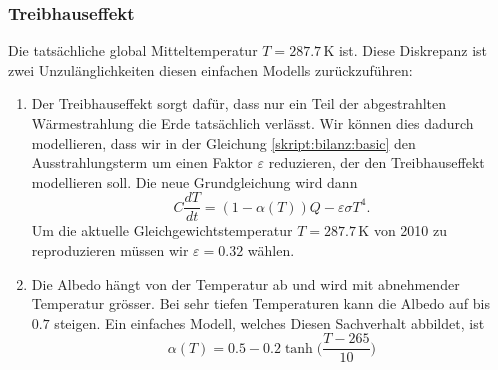 \subsubsection{Treibhauseffekt}
Die tatsächliche global Mitteltemperatur $T=287.7\,\text{K}$ ist.
Diese Diskrepanz ist zwei Unzulänglichkeiten diesen einfachen
Modells zurückzuführen:
\begin{enumerate}
\item
Der Treibhauseffekt sorgt dafür, dass nur ein Teil der abgestrahlten
Wärmestrahlung die Erde tatsächlich verlässt.
Wir können dies dadurch modellieren, dass wir in der Gleichung
\eqref{skript:bilanz:basic} den Ausstrahlungsterm um einen Faktor
$\varepsilon$ reduzieren, der den Treibhauseffekt modellieren soll.
Die neue Grundgleichung wird dann
\begin{equation}
C\frac{dT}{dt}
=
(1-\alpha(T)) Q - \varepsilon\sigma T^4.
\label{skript:bilanz:basic2}
\end{equation}
Um die aktuelle Gleichgewichtstemperatur $T=287.7\,\text{K}$ von 2010
zu reproduzieren müssen wir $\varepsilon=0.32$ wählen.
\item
Die Albedo hängt von der Temperatur ab und wird mit abnehmender 
Temperatur grösser.
Bei sehr tiefen Temperaturen kann die Albedo auf bis $0.7$ steigen.
Ein einfaches Modell, welches Diesen Sachverhalt abbildet, ist
\begin{equation}
\alpha(T)=0.5-0.2\tanh\biggl(\frac{T-265}{10}\biggr)
\label{skript:bilanz:albedo}
\end{equation}
\end{enumerate}

